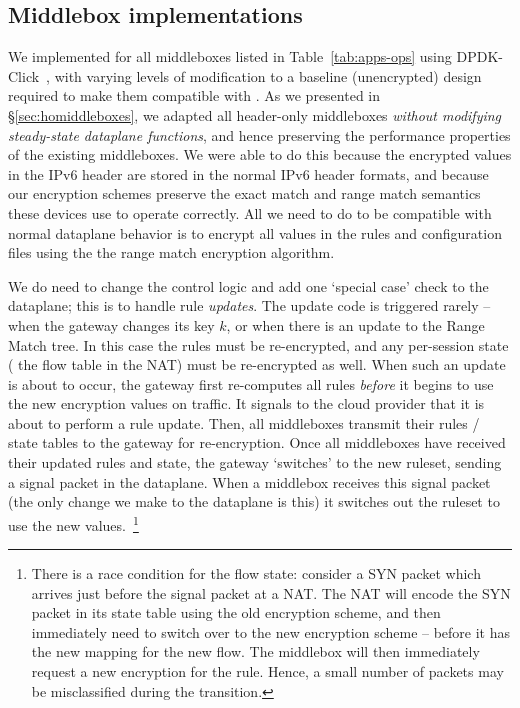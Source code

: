 \subsection{Middlebox implementations}
\label{sec:middleboxes}
We implemented \sys for all middleboxes listed in Table~\ref{tab:apps-ops} using DPDK-Click~\cite{click}, with varying levels of modification to a baseline (unencrypted) design required to make them compatible with \sys. 
As we presented in \S\ref{sec:homiddleboxes}, we adapted all header-only middleboxes {\it without modifying steady-state dataplane functions}, and hence preserving the performance properties of the existing middleboxes.
We were able to do this because the encrypted values in the IPv6 header are stored in the normal IPv6 header formats, and because our encryption schemes preserve the exact match and range match semantics these devices use to operate correctly.
All we need to do to be compatible with normal dataplane behavior is to encrypt all values in the rules and configuration files using the the range match encryption algorithm.

We do need to change the control logic and add one `special case' check to the dataplane; this is to handle rule {\it updates}. 
The update code is triggered rarely -- when the gateway changes its key $k$, or when there is an update to the Range Match tree.
In this case the rules must be re-encrypted, and any per-session state (\eg{} the flow table in the NAT) must be re-encrypted as well.
When such an update is about to occur, the gateway first re-computes all rules {\it before} it begins to use the new encryption values on traffic. It signals to the cloud provider that it is about to perform a rule update. Then, all middleboxes transmit their rules / state tables to the gateway for re-encryption. 
Once all middleboxes have received their updated rules and state, the gateway `switches' to the new ruleset, sending a signal packet in the dataplane. When a middlebox receives this signal packet (the only change we make to the dataplane is this) it switches out the ruleset to use the new values.~\footnote{\small There is a race condition for the flow state: consider a SYN packet which arrives just before the signal packet at a NAT. The NAT will encode the SYN packet in its state table using the old encryption scheme, and then immediately need to switch over to the new encryption scheme -- before it has the new mapping for the new flow. The middlebox will then immediately request a new encryption for the rule. Hence, a small number of packets may be misclassified during the transition.}

